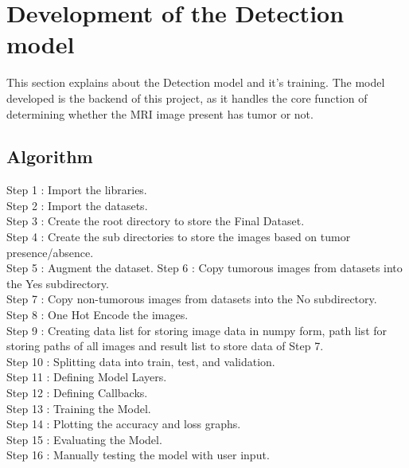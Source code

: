 \section{Development of the Detection model}
This section explains about the Detection model and it's training. The model developed is the backend of this project, as it handles the core function of determining whether the MRI image present has tumor or not.
\subsection{Algorithm}
Step 1 : Import the libraries.\\ 
Step 2 : Import the datasets.\\ 
Step 3 : Create the root directory to store the Final Dataset.\\ 
Step 4 : Create the sub directories to store the images based on tumor presence/absence.\\ 
Step 5 : Augment the dataset.
Step 6 : Copy tumorous images from datasets into the Yes subdirectory.\\ 
Step 7 : Copy non-tumorous images from datasets into the No subdirectory.\\
Step 8 : One Hot Encode the images.\\ 
Step 9 : Creating data list for storing image data in numpy form, path list for storing paths of all images and result list to store data of Step 7.\\ 
Step 10 : Splitting data into train, test, and validation.\\ 
Step 11 : Defining Model Layers.\\ 
Step 12 : Defining Callbacks.\\ 
Step 13 : Training the Model.\\ 
Step 14 : Plotting the accuracy and loss graphs.\\ 
Step 15 : Evaluating the Model.\\ 
Step 16 : Manually testing the model with user input.\\ 
